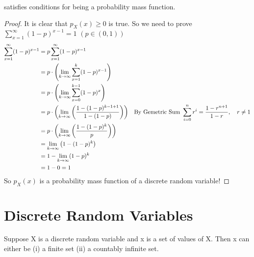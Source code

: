 \documentclass[11pt,oneside]{book}
\theoremstyle{break}
\theoremstyle{break}
\begin{document}
satisfies conditions for being a probability mass function. \begin{proof}
It is clear that $p_X(x)\geq 0$ is true. So we need to prove $\sum_{x=1}^{\infty}(1-p)^{x-1}=1$ \quad $(p\in (0,1))$\\
\begin{align*}
\sum_{x=1}^{\infty}(1-p)^{x-1}&=p\sum_{x=1}^{\infty}(1-p)^{x-1}\\
&=p\cdot \left(\lim_{k\rightarrow \infty} \sum_{x=1}^{k}(1-p)^{x-1}\right)\\
&=p\cdot \left(\lim_{k\rightarrow \infty} \sum_{x=0}^{k-1}(1-p)^{x}\right)\\
&=p\cdot \left( \lim_{k\rightarrow \infty} \left( \frac{1-(1-p)^{k-1+1}}{1-(1-p)}\right) \right) &\text{By Gemetric Sum } \sum_{i=0}^n r^i=\frac{1-r^{n+1}}{1-r}, \text{\quad} r\neq 1\\
&=p\cdot \left( \lim_{k\rightarrow \infty} \left( \frac{1-(1-p)^{k}}{p}\right)\right)\\
&=\lim_{k\rightarrow \infty} \left( 1-(1-p)^{k}\right)\\
&=1-\lim_{k\rightarrow \infty}(1-p)^k\\
&=1-0=1
\end{align*}
So $p_X(x)$ is a probability mass function of a discrete random variable!
\end{proof}
\newpage
\chapter[Discrete Random Variables]{Discrete Random Variables}
Suppose X is a discrete random variable and x is a set of values of X. Then x can either be (i) a finite set (ii) a countably infinite set.\\
\end{document}
